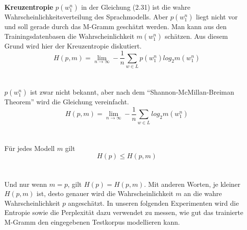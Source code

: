 \textbf{Kreuzentropie}
$p(w_{1}^{n})$ in der Gleichung (2.31) ist die wahre Wahrscheinlichkeitsverteilung des Sprachmodells. Aber $p(w_{1}^{n})$ liegt nicht vor und soll gerade durch das M-Gramm gesch\"atzt werden. Man kann aus den Trainingsdatenbasen die Wahrscheinlichkeit $m(w_{1}^{n})$ sch\"atzen. Aus diesem Grund  wird hier der Kreuzentropie diskutiert.
\begin{equation}
H(p,m)=\lim_{n\to\infty}-\frac{1}{n}\sum_{w\in L}p(w_{1}^{n})log_{2}m(w_{1}^{n})
\end{equation}
\\
\\
$p(w_{1}^{n})$ ist zwar nicht bekannt, aber nach dem "`Shannon-McMillan-Breiman Theorem"' wird die Gleichung vereinfacht. 
\begin{equation}
H(p,m)=\lim_{n\to\infty}-\frac{1}{n}\sum_{w\in L}log_{2}m(w_{1}^{n})
\end{equation}
\\
\\
F\"ur jedes Modell $m$ gilt \\
\begin{equation}
H(p)\leq H(p,m)
\end{equation}
\\
\\
Und nur wenn $m=p$, gilt $H(p)=H(p,m)$. Mit anderen Worten, je kleiner $H(p,m)$ ist, desto genauer wird die Wahrscheinlichkeit $m$ an die wahre Wahrscheinlichkeit $p$ angesch\"atzt.
In unseren folgenden Experimenten wird die Entropie sowie die Perplexit\"at dazu verwendet zu messen, wie gut das trainierte M-Gramm den eingegebenen Testkorpus modellieren kann.

